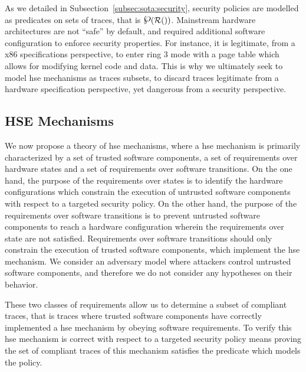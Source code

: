 As we detailed in Subsection~\ref{subsec:sota:security}, security policies are
modelled as predicates on sets of traces, that is $\powerset (\pathesLTS{Ez})$.
%
Mainstream hardware architectures are not ``safe'' by default, and required
additional software configuration to enforce security properties.
%
For instance, it is legitimate, from a x86 specifications perspective, to enter
ring 3 mode with a page table which allows for modifying kernel code and data.
%
This is why we ultimately seek to model \ac{hse} mechanisms as traces subsets,
to discard traces legitimate from a hardware specification perspective, yet
dangerous from a security perspective.

\subsection{HSE Mechanisms}
\label{subsec:speccert:hse}

We now propose a theory of \ac{hse} mechanisms, where a \ac{hse} mechanism is
primarily characterized by a set of trusted software components, a set of
requirements over hardware states and a set of requirements over software
transitions.
%
On the one hand, the purpose of the requirements over states is to identify the
hardware configurations which constrain the execution of untrusted software
components with respect to a targeted security policy.
%
On the other hand, the purpose of the requirements over software transitions is
to prevent untrusted software components to reach a hardware configuration
wherein the requirements over state are not satisfied.
%
Requirements over software transitions should only constrain the execution of
trusted software components, which implement the \ac{hse} mechanism.
%
We consider an adversary model where attackers control untrusted software
components, and therefore we do not consider any hypotheses on their behavior.

These two classes of requirements allow us to determine a subset of compliant
traces, that is traces where trusted software components have correctly
implemented a \ac{hse} mechanism by obeying software requirements.
%
%
To verify this \ac{hse} mechanism is correct with respect to a targeted security
policy means proving the set of compliant traces of this mechanism satisfies the
predicate which models the policy.

